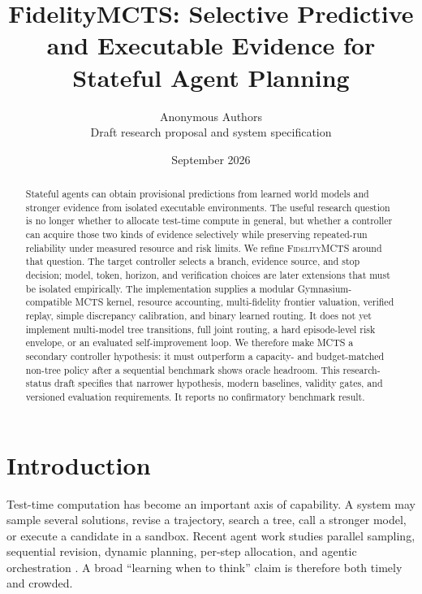\documentclass[10pt,twocolumn]{article}
\title{\vspace{-1.2em}\textbf{FidelityMCTS: Selective Predictive and Executable Evidence for Stateful Agent Planning}}
\author{Anonymous Authors\\
\small Draft research proposal and system specification}
\date{September 2026}
\newcommand{\method}{\textsc{FidelityMCTS}\xspace}
\begin{document}
\maketitle

\begin{abstract}
Stateful agents can obtain provisional predictions from learned world models
and stronger evidence from isolated executable environments. The useful
research question is no longer whether to allocate test-time compute in
general, but whether a controller can acquire those two kinds of evidence
selectively while preserving repeated-run reliability under measured resource
and risk limits. We refine \method around that question. The target controller
selects a branch, evidence source, and stop decision; model, token, horizon, and
verification choices are later extensions that must be isolated empirically.
The implementation supplies a modular Gymnasium-compatible MCTS kernel,
resource accounting, multi-fidelity frontier valuation, verified replay,
simple discrepancy calibration, and binary learned routing. It does not yet
implement multi-model tree transitions, full joint routing, a hard
episode-level risk envelope, or an evaluated self-improvement loop. We
therefore make MCTS a secondary controller hypothesis: it must outperform a
capacity- and budget-matched non-tree policy after a sequential benchmark shows
oracle headroom. This research-status draft specifies that narrower hypothesis,
modern baselines, validity gates, and versioned evaluation requirements. It
reports no confirmatory benchmark result.
\end{abstract}

\noindent
{}

\section{Introduction}

Test-time computation has become an important axis of capability. A system may
sample several solutions, revise a trajectory, search a tree, call a stronger
model, or execute a candidate in a sandbox. Recent agent work studies parallel
sampling, sequential revision, dynamic planning, per-step allocation, and
agentic orchestration \citep{zhu2025agentcompute,paglieri2025whenplan,
lee2026catts,qin2026atlas,kim2026coding}. A broad ``learning when to think''
claim is therefore both timely and crowded.
\end{document}
